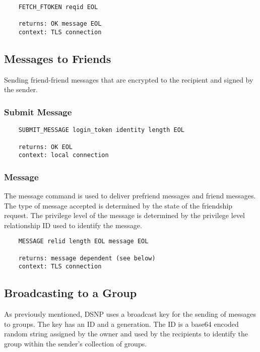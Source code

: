 \documentclass[letterpaper,11pt,oneside]{article}
\begin{document}
\vspace{10pt}
\begin{verbatim}
    FETCH_FTOKEN reqid EOL

    returns: OK message EOL
    context: TLS connection
\end{verbatim}

\subsection{Messages to Friends}

Sending friend-friend messages that are encrypted to the recipient and signed
by the sender. 

\subsubsection{Submit Message}

\vspace{10pt}
\begin{verbatim}
    SUBMIT_MESSAGE login_token identity length EOL

    returns: OK EOL
    context: local connection
\end{verbatim}
\vspace{10pt}

\subsubsection{Message}

The message command is used to deliver prefriend messages and friend messages.
The type of message accepted is determined by the state of the friendship
request. The privilege level of the message is determined by the privilege
level relationship ID used to identify the message.

\vspace{10pt}
\begin{verbatim}
    MESSAGE relid length EOL message EOL

    returns: message dependent (see below)
    context: TLS connection
\end{verbatim}

\subsection{Broadcasting to a Group}

As previously mentioned, DSNP uses a broadcast key for the sending of messages
to groups. The key has an ID and a generation. The ID is a base64 encoded
random string assigned by the owner and used by the recipients to identify the
group within the sender's collection of groups.
\end{document}
